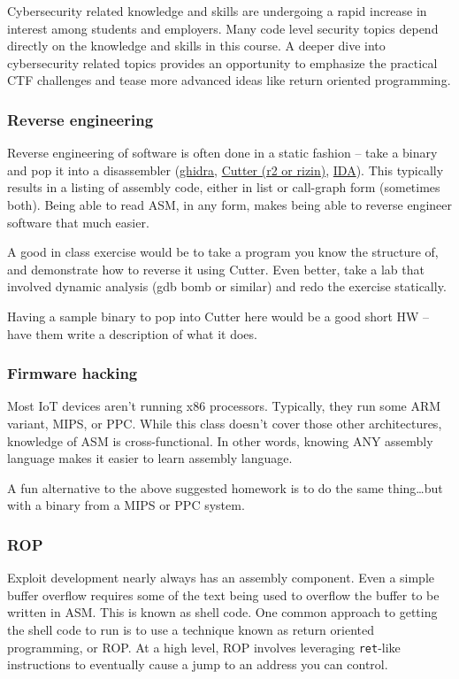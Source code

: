 \documentclass[12pt,letterpaper]{article}
\begin{document}
	Cybersecurity related knowledge and skills are undergoing a rapid increase in interest among students and employers. Many code level security topics depend directly on the knowledge and skills in this course. A deeper dive into cybersecurity related topics provides an opportunity to emphasize the practical CTF challenges and tease more advanced ideas like return oriented programming.

    \subsubsection{Reverse engineering}
    Reverse engineering of software is often done in a static fashion -- take a binary and pop it into a disassembler (\href{https://ghidra-sre.org/}{ghidra}, \href{https://cutter.re/}{Cutter (r2 or rizin)}, \href{https://www.hex-rays.com/products/ida/}{IDA}). This typically results in a listing of assembly code, either in list or call-graph form (sometimes both). Being able to read ASM, in any form, makes being able to reverse engineer software that much easier.

    A good in class exercise would be to take a program you know the structure of, and demonstrate how to reverse it using Cutter. Even better, take a lab that involved dynamic analysis (gdb bomb or similar) and redo the exercise statically.

    Having a sample binary to pop into Cutter here would be a good short HW -- have them write a description of what it does.

    \subsubsection{Firmware hacking}

    Most IoT devices aren't running x86 processors. Typically, they run some ARM variant, MIPS, or PPC. While this class doesn't cover those other architectures, knowledge of ASM is cross-functional. In other words, knowing ANY assembly language makes it easier to learn assembly language.

    A fun alternative to the above suggested homework is to do the same thing\ldots but with a binary from a MIPS or PPC system.

    \subsubsection{ROP}

    Exploit development nearly always has an assembly component. Even a simple buffer overflow requires some of the text being used to overflow the buffer to be written in ASM. This is known as shell code. One common approach to getting the shell code to run is to use a technique known as return oriented programming, or ROP. At a high level, ROP involves leveraging \texttt{ret}-like instructions to eventually cause a jump to an address you can control.
\end{document}
